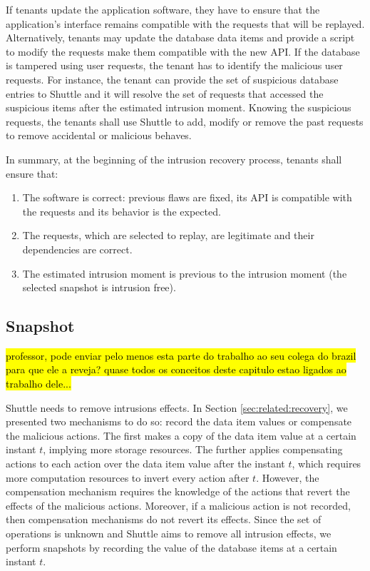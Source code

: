 If tenants update the application software, they have to ensure that the application's interface remains compatible with the requests that will be replayed. Alternatively, tenants may update the database data items and provide a script to modify the requests make them compatible with the new \ac{API}. If the database is tampered using user requests, the tenant has to identify the malicious user requests. For instance, the tenant can provide the set of suspicious database entries to Shuttle and it will resolve the set of requests that accessed the suspicious items after the estimated intrusion moment. Knowing the suspicious requests, the tenants shall use Shuttle to add, modify or remove the past requests to remove accidental or malicious behaves. 

In summary, at the beginning of the intrusion recovery process, tenants shall ensure that:
\begin{enumerate}
    \item The software is correct: previous flaws are fixed, its \ac{API} is compatible with the requests and its behavior is the expected.
    \item The requests, which are selected to replay, are legitimate and their dependencies are correct.
    \item The estimated intrusion moment is previous to the intrusion moment (the selected snapshot is intrusion free).
\end{enumerate} 


\subsection{Snapshot}
\label{sec:arch:snapshot}
\hl{professor, pode enviar pelo menos esta parte do trabalho ao seu colega do brazil para que ele a reveja? quase todos os conceitos deste capitulo estao ligados ao trabalho dele...}

Shuttle needs to remove intrusions effects. In Section \ref{sec:related:recovery}, we presented two mechanisms to do so: record the data item values or compensate the malicious actions. The first makes a copy of the data item value at a certain instant $t$, implying more storage resources. The further applies compensating actions to each action over the data item value after the instant $t$, which requires more computation resources to invert every action after $t$. However, the compensation mechanism requires the knowledge of the actions that revert the effects of the malicious actions. Moreover, if a malicious action is not recorded, then compensation mechanisms do not revert its effects. Since the set of operations is unknown and Shuttle aims to remove all intrusion effects, we perform snapshots by recording the value of the database items at a certain instant $t$.\\

